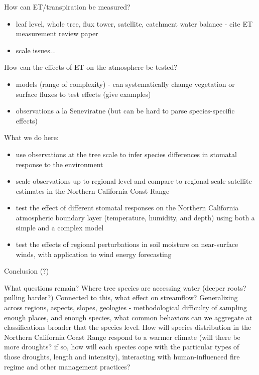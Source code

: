 How can ET/transpiration be measured?
\begin{itemize}
\item leaf level, whole tree, flux tower, satellite, catchment water balance - cite ET measurement review paper
\item scale issues...
\end{itemize}

How can the effects of ET on the atmosphere be tested?
\begin{itemize}
\item models (range of complexity) - can systematically change vegetation or surface fluxes to test effects (give examples)
\item observations a la Seneviratne (but can be hard to parse species-specific effects)
\end{itemize}

What we do here:
\begin{itemize}
\item use observations at the tree scale to infer species differences in stomatal response to the environment
\item scale observations up to regional level and compare to regional scale satellite estimates in the Northern California Coast Range
\item test the effect of different stomatal responses on the Northern California atmospheric boundary layer (temperature, humidity, and depth) using both a simple and a complex model
\item test the effects of regional perturbations in soil moisture on near-surface winds, with application to wind energy forecasting
\end{itemize}


Conclusion (?)

What questions remain?  Where tree species are accessing water (deeper roots?  pulling harder?) Connected to this, what effect on streamflow?  Generalizing across regions, aspects, slopes, geologies - methodological difficulty of sampling enough places, and enough species, what common behaviors can we aggregate at classifications broader that the species level.  How will species distribution in the Northern California Coast Range respond to a warmer climate (will there be more droughts? if so, how will each species cope with the particular types of those droughts, length and intensity), interacting with human-influenced fire regime and other management practices?